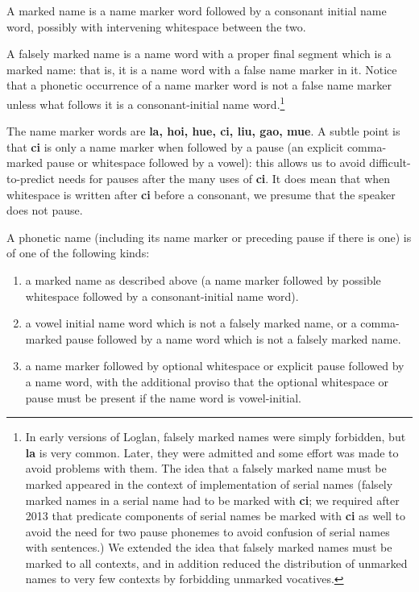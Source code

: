 \documentclass[12pt]{book}
\begin{document}
A marked name is a name marker word followed by a consonant initial name word, possibly with intervening whitespace between the two.

A falsely marked name is a name word with a proper final segment which is a marked name:  that is, it is a name word with a false name marker in it.  Notice that a phonetic
occurrence of a name marker word is not a false name marker unless what follows it is a consonant-initial name word.\footnote{In early versions of Loglan, falsely marked names were simply forbidden, but {\bf la} is very common.   Later, they were admitted and some effort was made to avoid problems with them.  The idea that a falsely marked name must be marked appeared in the context of implementation of serial names (falsely marked names in a serial name had to be marked with {\bf ci}; we required after 2013 that predicate components of serial names be marked
with {\bf ci} as well to avoid the need for two pause phonemes to avoid confusion of serial names with sentences.)  We extended the idea that falsely marked names must
be marked to all contexts, and in addition reduced the distribution of unmarked names to very few contexts by forbidding unmarked vocatives.}

The name marker words are {\bf la, hoi, hue, ci, liu, gao, mue}.  A subtle point is that {\bf ci} is only a name marker when followed by a pause (an explicit comma-marked pause
or whitespace followed by a vowel):  this allows us to avoid difficult-to-predict needs for pauses after the many uses of {\bf ci}.  It does mean that when whitespace is written after {\bf ci} before a consonant, we presume that the speaker does not pause.

A phonetic name (including its name marker or preceding pause if there is one) is of one of the following kinds:

\begin{enumerate}

\item a marked name as described above (a name marker followed by possible whitespace followed by a consonant-initial name word).

\item  a vowel initial name word which is not a falsely marked name, or  a comma-marked pause followed by a name word which is not a falsely marked name.

\item a name marker followed by optional whitespace or explicit pause followed by a name word, with the additional proviso that the optional whitespace or pause must be present if the name word is vowel-initial.

\end{enumerate}
\end{document}
